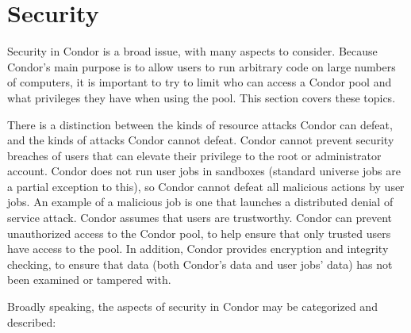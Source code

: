 \section{\label{sec:Security}Security}

Security in Condor is a broad issue, with many aspects to consider.
Because Condor's main purpose is to allow users to run arbitrary code
on large numbers of computers, it is important to try to limit who can
access a Condor pool and what privileges they have when using the
pool.  This section covers these topics.

There is a distinction between the
kinds of resource attacks Condor can defeat,
and the kinds of attacks Condor cannot defeat.
Condor cannot
prevent security breaches of users that can elevate their privilege to
the root or administrator account.
Condor does not run user jobs in
sandboxes (standard universe jobs are a partial exception to this),
so Condor cannot defeat all malicious actions by user jobs.
An example of a malicious job is
one that launches a distributed denial of service attack.
Condor assumes that users are trustworthy.
Condor can prevent unauthorized access to the Condor pool,
to help ensure that only trusted users have access to the pool.
In addition, Condor provides encryption and
integrity checking, to ensure that data (both Condor's data and user
jobs' data) has not been examined or tampered with.

Broadly speaking, the aspects of security in
Condor may be categorized and described: 

